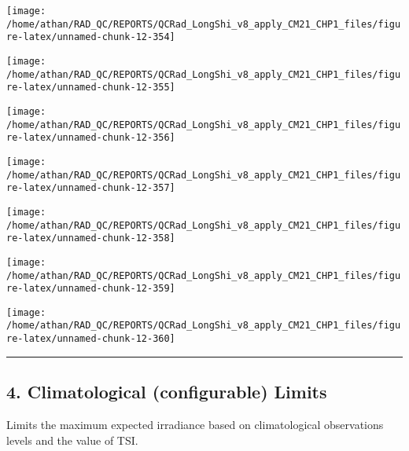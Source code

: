 \documentclass[
  10pt,
  a4paper,oneside]{article}
\begin{document}
\begin{center}\texttt{[image: /home/athan/RAD\_QC/REPORTS/QCRad\_LongShi\_v8\_apply\_CM21\_CHP1\_files/figure-latex/unnamed-chunk-12-354]} \end{center}

\begin{center}\texttt{[image: /home/athan/RAD\_QC/REPORTS/QCRad\_LongShi\_v8\_apply\_CM21\_CHP1\_files/figure-latex/unnamed-chunk-12-355]} \end{center}

\begin{center}\texttt{[image: /home/athan/RAD\_QC/REPORTS/QCRad\_LongShi\_v8\_apply\_CM21\_CHP1\_files/figure-latex/unnamed-chunk-12-356]} \end{center}

\begin{center}\texttt{[image: /home/athan/RAD\_QC/REPORTS/QCRad\_LongShi\_v8\_apply\_CM21\_CHP1\_files/figure-latex/unnamed-chunk-12-357]} \end{center}

\begin{center}\texttt{[image: /home/athan/RAD\_QC/REPORTS/QCRad\_LongShi\_v8\_apply\_CM21\_CHP1\_files/figure-latex/unnamed-chunk-12-358]} \end{center}

\begin{center}\texttt{[image: /home/athan/RAD\_QC/REPORTS/QCRad\_LongShi\_v8\_apply\_CM21\_CHP1\_files/figure-latex/unnamed-chunk-12-359]} \end{center}

\begin{center}\texttt{[image: /home/athan/RAD\_QC/REPORTS/QCRad\_LongShi\_v8\_apply\_CM21\_CHP1\_files/figure-latex/unnamed-chunk-12-360]} \end{center}

\begin{center}\rule{0.5\linewidth}{0.5pt}\end{center}

\newpage

\hypertarget{climatological-configurable-limits}{%
\subsection{4. Climatological (configurable) Limits}\label{climatological-configurable-limits}}

Limits the maximum expected irradiance based on climatological
observations levels and the value of TSI.
\end{document}
